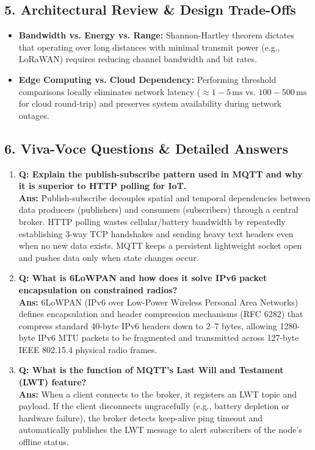\documentclass[11pt,a4paper]{article}
\begin{document}
\subsection*{5. Architectural Review \& Design Trade-Offs}
\begin{itemize}[noitemsep]
    \item \textbf{Bandwidth vs. Energy vs. Range:} Shannon-Hartley theorem dictates that operating over long distances with minimal transmit power (e.g., LoRaWAN) requires reducing channel bandwidth and bit rates.
    \item \textbf{Edge Computing vs. Cloud Dependency:} Performing threshold comparisons locally eliminates network latency ($\approx 1-5\,\text{ms}$ vs. $100-500\,\text{ms}$ for cloud round-trip) and preserves system availability during network outages.
\end{itemize}

\subsection*{6. Viva-Voce Questions \& Detailed Answers}
\begin{enumerate}[leftmargin=*]
    \item \textbf{Q: Explain the publish-subscribe pattern used in MQTT and why it is superior to HTTP polling for IoT.}\\
    \textbf{Ans:} Publish-subscribe decouples spatial and temporal dependencies between data producers (publishers) and consumers (subscribers) through a central broker. HTTP polling wastes cellular/battery bandwidth by repeatedly establishing 3-way TCP handshakes and sending heavy text headers even when no new data exists. MQTT keeps a persistent lightweight socket open and pushes data only when state changes occur.
    \item \textbf{Q: What is 6LoWPAN and how does it solve IPv6 packet encapsulation on constrained radios?}\\
    \textbf{Ans:} 6LoWPAN (IPv6 over Low-Power Wireless Personal Area Networks) defines encapsulation and header compression mechanisms (RFC 6282) that compress standard 40-byte IPv6 headers down to 2--7 bytes, allowing 1280-byte IPv6 MTU packets to be fragmented and transmitted across 127-byte IEEE 802.15.4 physical radio frames.
    \item \textbf{Q: What is the function of MQTT's Last Will and Testament (LWT) feature?}\\
    \textbf{Ans:} When a client connects to the broker, it registers an LWT topic and payload. If the client disconnects ungracefully (e.g., battery depletion or hardware failure), the broker detects keep-alive ping timeout and automatically publishes the LWT message to alert subscribers of the node's offline status.
\end{enumerate}
\end{document}

